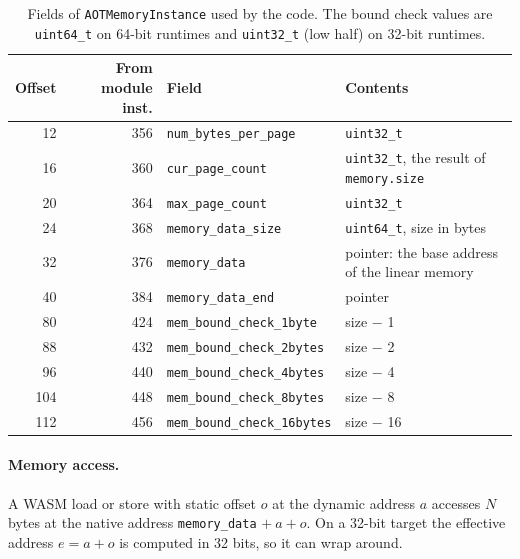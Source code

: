 \documentclass{article}
\begin{document}
\begin{table}[H]
\centering
\begin{tabular}{rrll}
    \hline
    Offset & From module inst. & Field & Contents \\
    \hline
    12  & 356 & \verb|num_bytes_per_page| & \verb|uint32_t| \\
    16  & 360 & \verb|cur_page_count| & \verb|uint32_t|, the result of \verb|memory.size| \\
    20  & 364 & \verb|max_page_count| & \verb|uint32_t| \\
    24  & 368 & \verb|memory_data_size| & \verb|uint64_t|, size in bytes \\
    32  & 376 & \verb|memory_data| & pointer: the base address of the linear memory \\
    40  & 384 & \verb|memory_data_end| & pointer \\
    80  & 424 & \verb|mem_bound_check_1byte| & size $-$ 1 \\
    88  & 432 & \verb|mem_bound_check_2bytes| & size $-$ 2 \\
    96  & 440 & \verb|mem_bound_check_4bytes| & size $-$ 4 \\
    104 & 448 & \verb|mem_bound_check_8bytes| & size $-$ 8 \\
    112 & 456 & \verb|mem_bound_check_16bytes| & size $-$ 16 \\
    \hline
\end{tabular}
\caption{Fields of \texttt{AOTMemoryInstance} used by the code. The bound check values are \texttt{uint64\_t} on 64-bit runtimes and \texttt{uint32\_t} (low half) on 32-bit runtimes.}
\label{table:memory-inst}
\end{table}

\paragraph{Memory access.}
A WASM load or store with static offset $o$ at the dynamic address $a$ accesses $N$ bytes at the native address \verb|memory_data| $+\ a + o$.
On a 32-bit target the effective address $e = a + o$ is computed in 32 bits, so it can wrap around.
\end{document}
